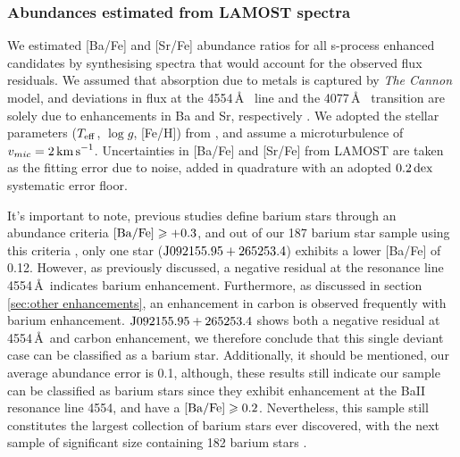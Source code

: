 \documentclass[a4paper,fleqn,usenatbib]{mnras}
\begin{document}
\subsubsection{Abundances estimated from LAMOST spectra}
We estimated [Ba/Fe] and [Sr/Fe] abundance ratios for all s-process enhanced candidates by synthesising spectra that would account for the observed flux residuals. We assumed that absorption due to metals is captured by \emph{The Cannon} model, and deviations in flux at the 4554\,\AA\  line and the 4077\,\AA\  transition are solely due to enhancements in Ba and Sr, respectively \citep{marcs,sme,vald,ispec}. We adopted the stellar parameters ($T_{\rm eff}$, $\log{g}$, [Fe/H]) from \citet{ho2017}, and assume a microturbulence of $v_{mic} = 2\,{\rm km\,s}^{-1}$. Uncertainties in [Ba/Fe] and [Sr/Fe] from LAMOST are taken as the fitting error due to noise, added in quadrature with an adopted $0.2\,{\rm dex}$ systematic error floor.

It's important to note, previous studies \citet{malaney1988} define barium stars through an abundance criteria $\rm[Ba/Fe]\geq +0.3$, and out of our 187 barium star sample using this criteria , only one star ($\rm J092155.95+265253.4$) exhibits a lower [Ba/Fe] of 0.12. However, as previously discussed, a negative residual at the  resonance line 4554\,\AA\, indicates barium enhancement. Furthermore, as discussed in section \ref{sec:other enhancements}, an enhancement in carbon is observed frequently with barium enhancement. $\rm J092155.95+265253.4$ shows both a negative residual at 4554\,\AA\, and carbon enhancement, we therefore conclude that this single deviant case can be classified as a barium star. Additionally, it should be mentioned, our average abundance error is 0.1, although, these results still indicate our sample can be classified as barium stars since they exhibit enhancement at the BaII resonance line 4554, and have a $\rm[Ba/Fe] \geq 0.2$. Nevertheless, this sample still constitutes the largest collection of barium stars ever discovered, with the next sample of significant size containing 182 barium stars \citep[e.g.,][]{decastro2016}.
\end{document}
